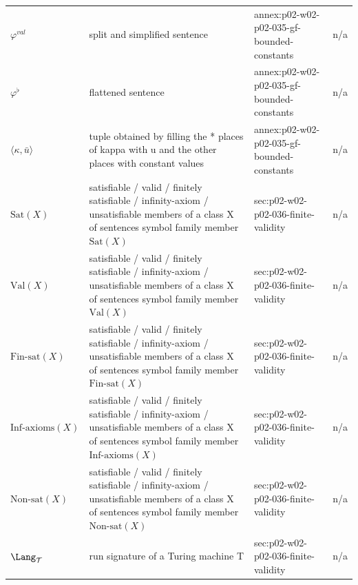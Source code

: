 \begin{longtable}{@{}p{}p{}p{}p{}@{}}
\(\varphi^{\mathit{val}}\) & split and simplified sentence & annex:\allowbreak{}p02-\allowbreak{}w02-\allowbreak{}p02-\allowbreak{}035-\allowbreak{}gf-\allowbreak{}bounded-\allowbreak{}constants & n/a \\
\(\varphi^{\flat}\) & flattened sentence & annex:\allowbreak{}p02-\allowbreak{}w02-\allowbreak{}p02-\allowbreak{}035-\allowbreak{}gf-\allowbreak{}bounded-\allowbreak{}constants & n/a \\
\(\langle\kappa,\allowbreak \bar u\rangle\) & tuple obtained by filling the * places of kappa with u and the other places with constant values & annex:\allowbreak{}p02-\allowbreak{}w02-\allowbreak{}p02-\allowbreak{}035-\allowbreak{}gf-\allowbreak{}bounded-\allowbreak{}constants & n/a \\
\(\mathrm{Sat}(X)\) & satisfiable / valid / finitely satisfiable / infinity-axiom / unsatisfiable members of a class X of sentences symbol family member \(\mathrm{Sat}(X)\) & sec:\allowbreak{}p02-\allowbreak{}w02-\allowbreak{}p02-\allowbreak{}036-\allowbreak{}finite-\allowbreak{}validity & n/a \\
\(\mathrm{Val}(X)\) & satisfiable / valid / finitely satisfiable / infinity-axiom / unsatisfiable members of a class X of sentences symbol family member \(\mathrm{Val}(X)\) & sec:\allowbreak{}p02-\allowbreak{}w02-\allowbreak{}p02-\allowbreak{}036-\allowbreak{}finite-\allowbreak{}validity & n/a \\
\(\mathrm{Fin\text{-}sat}(X)\) & satisfiable / valid / finitely satisfiable / infinity-axiom / unsatisfiable members of a class X of sentences symbol family member \(\mathrm{Fin\text{-}sat}(X)\) & sec:\allowbreak{}p02-\allowbreak{}w02-\allowbreak{}p02-\allowbreak{}036-\allowbreak{}finite-\allowbreak{}validity & n/a \\
\(\mathrm{Inf\text{-}axioms}(X)\) & satisfiable / valid / finitely satisfiable / infinity-axiom / unsatisfiable members of a class X of sentences symbol family member \(\mathrm{Inf\text{-}axioms}(X)\) & sec:\allowbreak{}p02-\allowbreak{}w02-\allowbreak{}p02-\allowbreak{}036-\allowbreak{}finite-\allowbreak{}validity & n/a \\
\(\mathrm{Non\text{-}sat}(X)\) & satisfiable / valid / finitely satisfiable / infinity-axiom / unsatisfiable members of a class X of sentences symbol family member \(\mathrm{Non\text{-}sat}(X)\) & sec:\allowbreak{}p02-\allowbreak{}w02-\allowbreak{}p02-\allowbreak{}036-\allowbreak{}finite-\allowbreak{}validity & n/a \\
\(\Lang_{\mathcal T}\) & run signature of a Turing machine T & sec:\allowbreak{}p02-\allowbreak{}w02-\allowbreak{}p02-\allowbreak{}036-\allowbreak{}finite-\allowbreak{}validity & n/a \\

\end{longtable}

